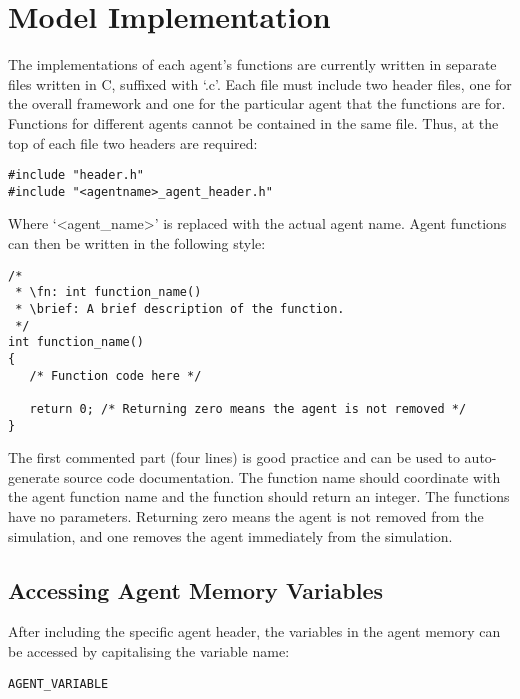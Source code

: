 \section{Model Implementation}
\label{sec:model_implementation}

The implementations of each agent's functions are currently written in separate
files written in C, suffixed with `.c'. Each file must include two
header files, one for the overall framework and one for the particular agent that the functions are for.
Functions for different agents cannot be contained in the same file.
Thus, at the top of each file two headers are required:

\begin{mylisting}
\begin{verbatim}
#include "header.h"
#include "<agentname>_agent_header.h"
\end{verbatim}
\end{mylisting}

Where `<agent\_name>' is replaced with the actual agent name.
Agent functions can then be written in the following style:

\begin{mylisting}
\begin{verbatim}
/*
 * \fn: int function_name()
 * \brief: A brief description of the function.
 */
int function_name()
{
   /* Function code here */

   return 0; /* Returning zero means the agent is not removed */
}
\end{verbatim}
\end{mylisting}

The first commented part (four lines) is good practice and can be used to
auto-generate source code documentation. The function name should coordinate
with the agent function name and the function should return an integer. The
functions have no parameters. Returning zero means the agent is not removed from
the simulation, and one removes the agent immediately from the simulation.

\subsection{Accessing Agent Memory Variables}

After including the specific agent header, the variables in the
agent memory can be accessed by capitalising the variable name:

\begin{mylisting}
\begin{verbatim}
AGENT_VARIABLE
\end{verbatim}
\end{mylisting}

